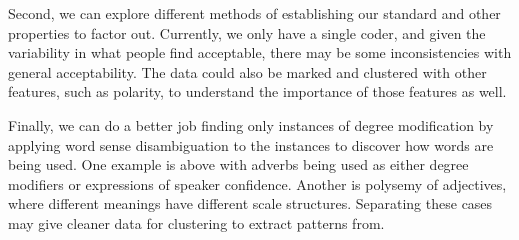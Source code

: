 \documentclass[11pt]{amsart}
\begin{document}
Second, we can explore different methods of establishing our standard and other properties to factor out. Currently, we only have a single coder, and given the variability in what people find acceptable, there may be some inconsistencies with general acceptability. The data could also be marked and clustered with other features, such as polarity, to understand the importance of those features as well.

Finally, we can do a better job finding only instances of degree modification by applying word sense disambiguation to the instances to discover how words are being used. One example is above with adverbs being used as either degree modifiers or expressions of speaker confidence. Another is polysemy of adjectives, where different meanings have different scale structures. Separating these cases may give cleaner data for clustering to extract patterns from.



\end{document}
